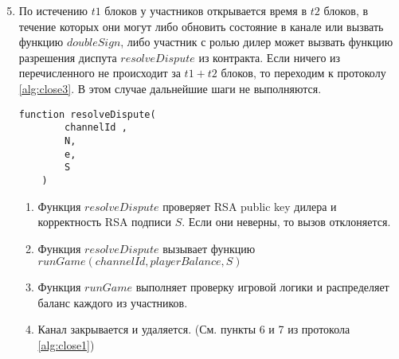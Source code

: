 \begin{algorithm}
\begin{enumerate}
	\setcounter{enumi}{4}
	\item По истечению $t1$ блоков у участников открывается время в $t2$ блоков, в течение которых они могут либо обновить состояние в канале или вызвать функцию $doubleSign$, либо участник с ролью дилер может вызвать функцию разрешения диспута $resolveDispute$ из контракта. Если ничего из перечисленного не происходит за $t1+t2$ блоков, то переходим к протоколу \autoref{alg:close3}. В этом случае дальнейшие шаги не выполняются. \label{block}
\begin{lstlisting}
function resolveDispute(
        channelId ,
        N,
        e,
        S
    )
\end{lstlisting}
\begin{enumerate}
	\item  Функция $resolveDispute$ проверяет RSA public key дилера и корректность RSA подписи $S$. Если они неверны, то вызов отклоняется.
	\item Функция $resolveDispute$ вызывает функцию $runGame(channelId , playerBalance, S)$
	 \item Функция $runGame$ выполняет проверку игровой логики и распределяет баланс каждого из участников.
	\item  Канал закрывается и удаляется. (См. пункты 6 и 7 из протокола \autoref{alg:close1})
\end{enumerate}
\end{enumerate}
\end{algorithm}

